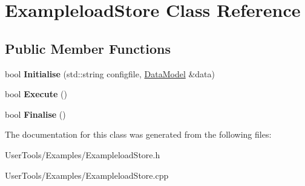\hypertarget{classExampleloadStore}{
\section{ExampleloadStore Class Reference}
\label{classExampleloadStore}
}
\subsection*{Public Member Functions}
\begin{DoxyCompactItemize}
\item 
\hypertarget{classExampleloadStore_aa36ea82e625367750cf90f47b68b4868}{
bool {\bfseries Initialise} (std::string configfile, \hyperlink{classDataModel}{DataModel} \&data)}
\label{classExampleloadStore_aa36ea82e625367750cf90f47b68b4868}

\item 
\hypertarget{classExampleloadStore_abb8ad989ae4890d9058989e9f4c1c5a7}{
bool {\bfseries Execute} ()}
\label{classExampleloadStore_abb8ad989ae4890d9058989e9f4c1c5a7}

\item 
\hypertarget{classExampleloadStore_a0170aae0ee1e46ea8e6132fb4874bb8d}{
bool {\bfseries Finalise} ()}
\label{classExampleloadStore_a0170aae0ee1e46ea8e6132fb4874bb8d}

\end{DoxyCompactItemize}


The documentation for this class was generated from the following files:\begin{DoxyCompactItemize}
\item 
UserTools/Examples/ExampleloadStore.h\item 
UserTools/Examples/ExampleloadStore.cpp\end{DoxyCompactItemize}

